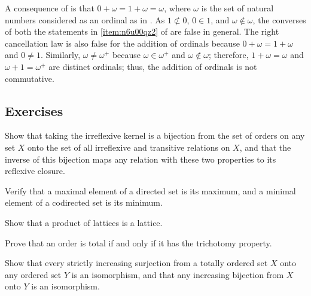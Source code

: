 \documentclass{article}
\begin{document}
A consequence of  is that
\(0 + \omega = 1 + \omega = \omega\), where \(\omega\) is the set of
natural numbers considered as an ordinal as in .
As \(1 \nsubset 0\), \(0 \in 1\), and \(\omega \notin \omega\), the
converses of both the statements in \cref{item:n6u00qz2} of
 are false in general.  The right cancellation law
is also false for the addition of ordinals because
\(0 + \omega = 1 + \omega\) and \(0 \neq 1\).  Similarly,
\(\omega \neq \omega^+\) because \(\omega \in \omega^+\) and
\(\omega \notin \omega\); therefore, \(1 + \omega = \omega\) and
\(\omega + 1 = \omega^+\) are distinct ordinals; thus, the addition of
ordinals is not commutative.

\subsection{Exercises}
\label{sec:q1c2w2jy}

\begin{exercise}
  \label{exe:eydusvz3}
  Show that taking the irreflexive kernel is a bijection from the set
  of orders on any set \(X\) onto the set of all irreflexive and
  transitive relations on \(X\), and that the inverse of this
  bijection maps any relation with these two properties to its
  reflexive closure.
\end{exercise}

\begin{exercise}
  \label{exe:swjbrepg}
  Verify that a maximal element of a directed set is its maximum, and
  a minimal element of a codirected set is its minimum.
\end{exercise}

\begin{exercise}
  \label{exe:yowl3axc}
  Show that a product of lattices is a lattice.
\end{exercise}

\begin{exercise}
  \label{exe:4knqif5b}
  Prove that an order is total if and only if it has the trichotomy
  property.
\end{exercise}

\begin{exercise}
  \label{exe:v1tw1ijd}
  Show that every strictly increasing surjection from a totally
  ordered set \(X\) onto any ordered set \(Y\) is an isomorphism, and
  that any increasing bijection from \(X\) onto \(Y\) is an
  isomorphism.
\end{exercise}
\end{document}
